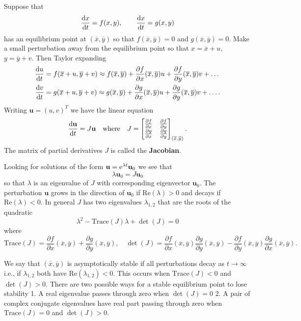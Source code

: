 \documentclass[11pt]{article}
\begin{document}
Suppose that
\[ \frac{{\rm d} x}{{\rm d}t} = f(x,y), \qquad \frac{{\rm d} x}{{\rm d}t} = g(x,y)\]
has an equilibrium point at \((\overline{x}, \overline{y})\) so that
\(f(\overline{x}, \overline{y})= 0\) and
\(g(\overline{x}, \overline{y})=0\). Make a small perturbation away from
the equilibrium point so that \(x = \overline{x} + u\),
\(y = \overline{y}+v\). Then Taylor expanding \begin{align*}
 \frac{{\rm d} u}{{\rm d}t} &= f(\overline{x} + u, \overline{y}+v) \approx f(\overline{x}, \overline{y}) + \frac{\partial f}{\partial x}(\overline{x}, \overline{y}) u + \frac{\partial f}{\partial y}(\overline{x}, \overline{y}) v + \ldots\\
  \frac{{\rm d} v}{{\rm d}t} &= g( \overline{x} + u, \overline{y}+v) \approx g(\overline{x}, \overline{y}) + \frac{\partial g}{\partial x}(\overline{x}, \overline{y}) u + \frac{\partial g}{\partial y}(\overline{x}, \overline{y}) v + \ldots.
\end{align*} Writing \(\mathbf{u} = (u,v)^T\) we have the linear
equation
\[  \frac{{\rm d} \mathbf{u}}{{\rm d}t} = J \mathbf{u} \quad \mbox{where} \quad J = \begin{bmatrix} \frac{\partial f}{\partial x} & \frac{\partial f}{\partial y} \\ \frac{\partial g}{\partial x} & \frac{\partial g}{\partial y}\end{bmatrix}_{(\overline{x}, \overline{y})}.\]
The matrix of partial derivatives \(J\) is called the \textbf{Jacobian}.

Looking for solutions of the form
\(\mathbf{u} = {\rm e}^{\lambda t} \mathbf{u}_0\) we see that
\[ \lambda \mathbf{u}_0 = J \mathbf{u}_0\] so that \(\lambda\) is an
eigenvalue of \(J\) with corresponding eigenvector \(\mathbf{u}_0\). The
perturbation \(\mathbf{u}\) grows in the direction of \(\mathbf{u}_0\)
if \(\mbox{Re}(\lambda)>0\) and decays if \(\mbox{Re}(\lambda)<0\). In
general \(J\) has two eigenvalues \(\lambda_{1,2}\) that are the roots
of the quadratic \[\lambda^2 - \mbox{Trace}(J) \lambda + \det(J) =0 \]
where
\[ \mbox{Trace}(J)= \frac{\partial f}{\partial x}(\overline{x}, \overline{y}) + \frac{\partial g}{\partial y}(\overline{x}, \overline{y}), \quad \det(J) = \frac{\partial f}{\partial x}(\overline{x}, \overline{y})\frac{\partial g}{\partial y}(\overline{x}, \overline{y})- \frac{\partial f}{\partial y}(\overline{x}, \overline{y})\frac{\partial g}{\partial x}(\overline{x}, \overline{y}).\]

We say that \((\overline{x}, \overline{y})\) is asymptotically stable if
all perturbations decay as \(t\to \infty\) i.e., if \(\lambda_{1,2}\)
both have \(\mbox{Re}(\lambda_{1,2})<0\). This occurs when
\(\mbox{Trace}(J)<0\) and \(\det(J)>0\). There are two possible ways for
a stable equilibrium point to lose stability 1. A real eigenvalue passes
through zero when \(\det(J)=0\) 2. A pair of complex conjugate
eigenvalues have real part passing through zero when
\(\mbox{Trace}(J)=0\) and \(\det(J)>0\).
\end{document}
